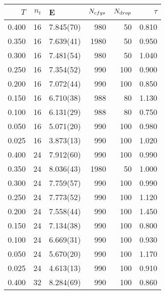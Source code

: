 \begin{tabular}{rrlrrr}
\hline
   $T$ &   $n_t$ & E         &   $N_{\textrm cfgs}$ &   $N_{\textrm drop}$ &   $\tau$ \\
\hline
 0.400 &      16 & 7.845(70) &                  980 &                   50 &    0.810 \\
 0.350 &      16 & 7.639(41) &                 1980 &                   50 &    0.950 \\
 0.300 &      16 & 7.481(54) &                  980 &                   50 &    1.040 \\
 0.250 &      16 & 7.354(52) &                  990 &                  100 &    0.900 \\
 0.200 &      16 & 7.072(44) &                  990 &                  100 &    0.850 \\
 0.150 &      16 & 6.710(38) &                  988 &                   80 &    1.130 \\
 0.100 &      16 & 6.131(29) &                  988 &                   80 &    0.750 \\
 0.050 &      16 & 5.071(20) &                  990 &                  100 &    0.980 \\
 0.025 &      16 & 3.873(13) &                  990 &                  100 &    1.020 \\
 0.400 &      24 & 7.912(60) &                  990 &                  100 &    0.990 \\
 0.350 &      24 & 8.036(43) &                 1980 &                   50 &    1.000 \\
 0.300 &      24 & 7.759(57) &                  990 &                  100 &    0.990 \\
 0.250 &      24 & 7.773(52) &                  990 &                  100 &    1.120 \\
 0.200 &      24 & 7.558(44) &                  990 &                  100 &    1.450 \\
 0.150 &      24 & 7.134(38) &                  990 &                  100 &    0.800 \\
 0.100 &      24 & 6.669(31) &                  990 &                  100 &    0.930 \\
 0.050 &      24 & 5.670(20) &                  990 &                  100 &    1.170 \\
 0.025 &      24 & 4.613(13) &                  990 &                  100 &    0.910 \\
 0.400 &      32 & 8.284(69) &                  990 &                  100 &    0.860 \\

\end{tabular}
